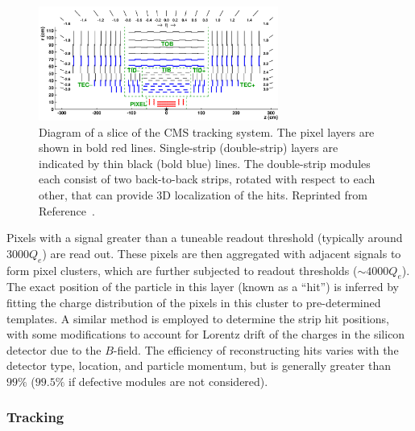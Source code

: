 \begin{figure}[]
    \begin{center} 
        \includegraphics[width=0.7\textwidth]{figures/cms/tracker.png}
        \caption{Diagram of a slice of the CMS tracking system.
                 The pixel layers are shown in bold red lines.
                 Single-strip (double-strip) layers are indicated by thin black (bold blue) lines.
                 The double-strip modules each consist of two back-to-back strips, rotated with respect to each other, that can provide 3D localization of the hits.
                 Reprinted from Reference~\cite{cmstracker}.}
        \label{fig:cms:si}
    \end{center}
\end{figure}

Pixels with a signal greater than a tuneable readout threshold (typically around $3000 Q_e$) are read out.
These pixels are then aggregated with adjacent signals to form pixel clusters, which are further subjected to readout thresholds ($\sim 4000 Q_e$).
The exact position of the particle in this layer (known as a ``hit'') is inferred by fitting the charge distribution of the pixels in this cluster to pre-determined templates.
A similar method is employed to determine the strip hit positions, with some modifications to account for Lorentz drift of the charges in the silicon detector due to the $B$-field. 
The efficiency of reconstructing hits varies with the detector type, location, and particle momentum, but is generally greater than $99\%$ ($99.5\%$ if defective modules are not considered). 

\subsubsection{Tracking}

